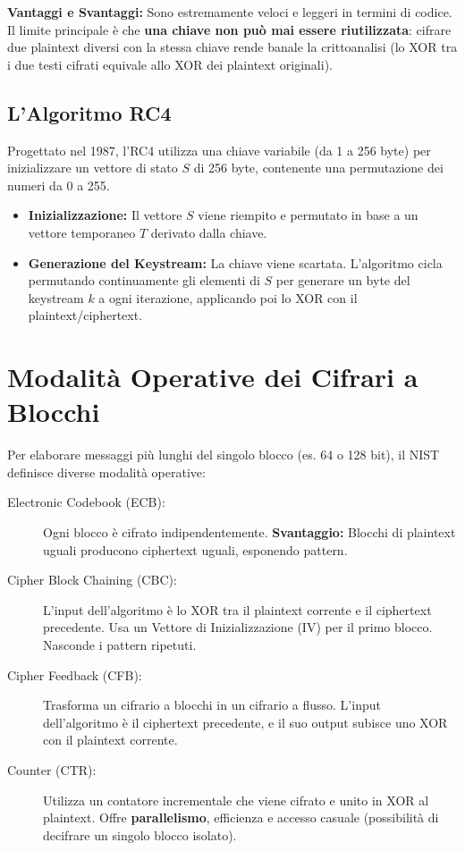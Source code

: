 \textbf{Vantaggi e Svantaggi:} Sono estremamente veloci e leggeri in termini di codice. Il limite principale è che \textbf{una chiave non può mai essere riutilizzata}: cifrare due plaintext diversi con la stessa chiave rende banale la crittoanalisi (lo XOR tra i due testi cifrati equivale allo XOR dei plaintext originali).

\subsection{L'Algoritmo RC4}
Progettato nel 1987, l'RC4 utilizza una chiave variabile (da 1 a 256 byte) per inizializzare un vettore di stato $S$ di 256 byte, contenente una permutazione dei numeri da 0 a 255.

\begin{itemize}
    \item \textbf{Inizializzazione:} Il vettore $S$ viene riempito e permutato in base a un vettore temporaneo $T$ derivato dalla chiave.
    \item \textbf{Generazione del Keystream:} La chiave viene scartata. L'algoritmo cicla permutando continuamente gli elementi di $S$ per generare un byte del keystream $k$ a ogni iterazione, applicando poi lo XOR con il plaintext/ciphertext.
\end{itemize}

\section{Modalità Operative dei Cifrari a Blocchi}

Per elaborare messaggi più lunghi del singolo blocco (es. 64 o 128 bit), il NIST definisce diverse modalità operative:

\begin{description}
    \item[Electronic Codebook (ECB):] Ogni blocco è cifrato indipendentemente. \textbf{Svantaggio:} Blocchi di plaintext uguali producono ciphertext uguali, esponendo pattern.
    \item[Cipher Block Chaining (CBC):] L'input dell'algoritmo è lo XOR tra il plaintext corrente e il ciphertext precedente. Usa un Vettore di Inizializzazione (IV) per il primo blocco. Nasconde i pattern ripetuti.
    \item[Cipher Feedback (CFB):] Trasforma un cifrario a blocchi in un cifrario a flusso. L'input dell'algoritmo è il ciphertext precedente, e il suo output subisce uno XOR con il plaintext corrente.
    \item[Counter (CTR):] Utilizza un contatore incrementale che viene cifrato e unito in XOR al plaintext. Offre \textbf{parallelismo}, efficienza e accesso casuale (possibilità di decifrare un singolo blocco isolato).
\end{description}


